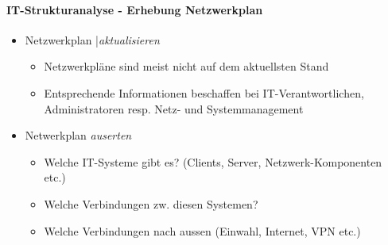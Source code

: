 \documentclass[10pt,a4paper]{article}
\begin{document}
\paragraph*{IT-Strukturanalyse - Erhebung Netzwerkplan}

\begin{itemize}[noitemsep,topsep=0pt,leftmargin=*]
    \item Netzwerkplan |\textsl{aktualisieren}
    \begin{itemize}[noitemsep,topsep=0pt,leftmargin=*]
        \item Netzwerkpläne sind meist nicht auf dem
        aktuellsten Stand
        \item Entsprechende Informationen beschaffen bei
        IT-Verantwortlichen, Administratoren resp.
        Netz- und Systemmanagement
    \end{itemize}
    \item Netwerkplan \textsl{auserten}
    \begin{itemize}[noitemsep,topsep=0pt,leftmargin=*]
        \item  Welche IT-Systeme gibt es? (Clients, Server,
        Netzwerk-Komponenten etc.)
        \item Welche Verbindungen zw. diesen Systemen?
        \item Welche Verbindungen nach aussen (Einwahl,
        Internet, VPN etc.)
    \end{itemize}
\end{itemize}
\end{document}
